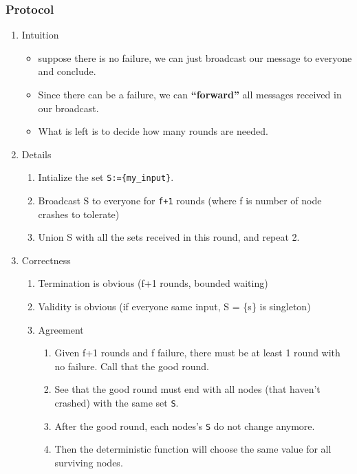 \documentclass[11pt]{article}
\begin{document}
\subsubsection{Protocol}
\label{sec:orgeebc586}
\begin{enumerate}
  \item Intuition
        \label{sec:org8c4a5d5}
        \begin{itemize}
          \item suppose there is no failure, we can just broadcast our message to everyone and conclude.
          \item Since there can be a failure, we can \textbf{``forward''} all messages received in our broadcast.
          \item What is left is to decide how many rounds are needed.
        \end{itemize}
  \item Details
        \label{sec:org84abdb8}
        \begin{enumerate}
          \item Intialize the set \texttt{S:=\{my\_input\}}.
          \item Broadcast S to everyone for \texttt{f+1} rounds (where f is number of node crashes
                to tolerate)
          \item Union S with all the sets received in this round, and repeat 2.
        \end{enumerate}
  \item Correctness
        \label{sec:org3f8a457}
        \begin{enumerate}
          \item Termination is obvious (f+1 rounds, bounded waiting)
                \label{sec:orgc0c8b1c}
          \item Validity is obvious (if everyone same input, S = \{s\} is singleton)
                \label{sec:org2012c0f}
          \item Agreement
                \label{sec:orge6e4d16}
                \begin{enumerate}
                  \item Given f+1 rounds and f failure, there must be at least 1 round with no
                        failure. Call that the good round.
                  \item See that the good round must end with all nodes (that haven't crashed) with
                        the same set \texttt{S}.
                  \item After the good round, each nodes's \texttt{S} do not change anymore.
                  \item Then the deterministic function will choose the same value for all surviving
                        nodes.
                \end{enumerate}
        \end{enumerate}
\end{enumerate}
\end{document}
